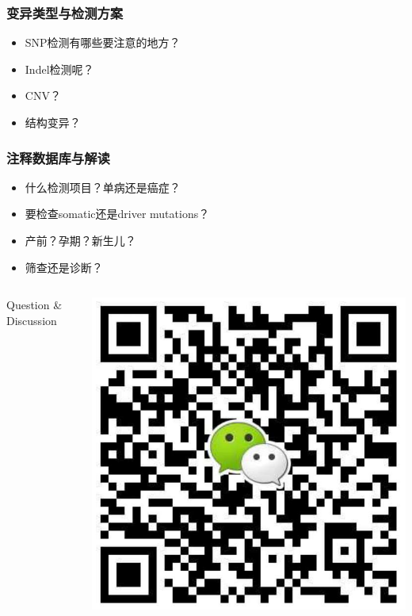 \documentclass[12pt]{beamer}
\begin{document}
\begin{frame}\frametitle{变异类型与检测方案}
\begin{itemize}
\item SNP检测有哪些要注意的地方？
\item Indel检测呢？
\item CNV？
\item 结构变异？
\end{itemize}
\end{frame}

\begin{frame}\frametitle{注释数据库与解读}
  \begin{itemize}
\item 什么检测项目？单病还是癌症？
\item 要检查somatic还是driver mutations？
\item 产前？孕期？新生儿？
\item 筛查还是诊断？  
\end{itemize}

\end{frame}

\begin{frame}
  \begin{columns}
    \begin{column}{0.5\textwidth}
      \huge{Question \& Discussion}

      
    \end{column}
    \begin{column}{0.5\textwidth}
        \includegraphics[width=\textwidth]{figures/wchat.jpg}  
    \end{column}

  \end{columns}
  \end{frame}
\end{document}
